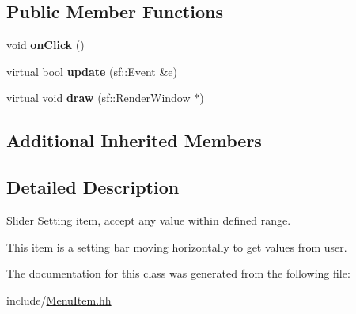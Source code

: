 \subsection*{Public Member Functions}
\begin{DoxyCompactItemize}
\item 
void {\bfseries on\+Click} ()\hypertarget{classMenuSlider_a1972e6ce5f77f2208b6e6242ab7b1377}{}\label{classMenuSlider_a1972e6ce5f77f2208b6e6242ab7b1377}

\item 
virtual bool {\bfseries update} (sf\+::\+Event \&e)\hypertarget{classMenuSlider_ad8b55e8be0022a32e6898ab9379247cf}{}\label{classMenuSlider_ad8b55e8be0022a32e6898ab9379247cf}

\item 
virtual void {\bfseries draw} (sf\+::\+Render\+Window $\ast$)\hypertarget{classMenuSlider_a028c84134f5d0f1afddd80a388e82be0}{}\label{classMenuSlider_a028c84134f5d0f1afddd80a388e82be0}

\end{DoxyCompactItemize}
\subsection*{Additional Inherited Members}


\subsection{Detailed Description}
Slider Setting item, accept any value within defined range. 

This item is a setting bar moving horizontally to get values from user. 

The documentation for this class was generated from the following file\+:\begin{DoxyCompactItemize}
\item 
include/\hyperlink{MenuItem_8hh}{Menu\+Item.\+hh}\end{DoxyCompactItemize}
